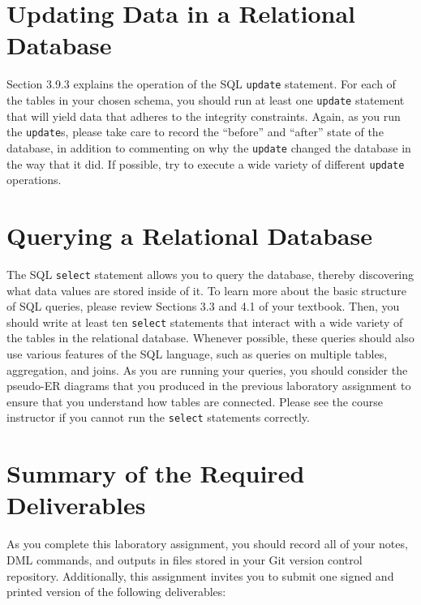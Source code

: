\vspace*{-.05in}
\section*{Updating Data in a Relational Database}

Section 3.9.3 explains the operation of the SQL {\tt update} statement.  For each of the tables in your chosen schema,
you should run at least one {\tt update} statement that will yield data that adheres to the integrity constraints.
Again, as you run the {\tt update}s, please take care to record the ``before'' and ``after'' state of the database, in
addition to commenting on why the {\tt update} changed the database in the way that it did. If possible, try to execute
a wide variety of different {\tt update} operations.

\vspace*{-.05in}
\section*{Querying a Relational Database}

The SQL {\tt select} statement allows you to query the database, thereby discovering what data values are stored inside
of it. To learn more about the basic structure of SQL queries, please review Sections 3.3 and 4.1 of your textbook.
Then, you should write at least ten {\tt select} statements that interact with a wide variety of the tables in the
relational database.  Whenever possible, these queries should also use various features of the SQL language, such as
queries on multiple tables, aggregation, and joins. As you are running your queries, you should consider the pseudo-ER
diagrams that you produced in the previous laboratory assignment to ensure that you understand how tables are connected.
Please see the course instructor if you cannot run the {\tt select} statements correctly.

\section*{Summary of the Required Deliverables}

As you complete this laboratory assignment, you should record all of your notes, DML commands, and outputs in files
stored in your Git version control repository.  Additionally, this assignment invites you to submit one signed and
printed version of the following deliverables:


